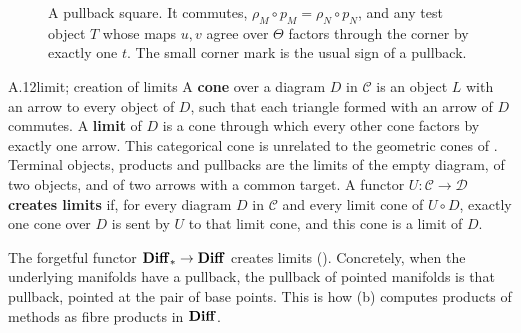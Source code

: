 \begin{figure}[tbp]
\centering
{}
\caption{A pullback square. It commutes, $\rho_M\circ p_M=\rho_N\circ p_N$, and any test object $T$ whose maps $u,v$
  agree over $\Theta$ factors through the corner by exactly one $t$. The small corner mark is the usual sign of a
  pullback.}
\label{fig:bg-pullback}
\end{figure}


\begin{bgentry}{A.12}{limit; creation of limits}
A \textbf{cone} over a diagram $D$ in $\mathcal C$ is an object $L$ with an arrow to every object of $D$, such that each
triangle formed with an arrow of $D$ commutes. A \textbf{limit} of $D$ is a cone through which every other cone factors
by exactly one arrow. This categorical cone is unrelated to the geometric cones of . Terminal objects,
products and pullbacks are the limits of the empty diagram, of two objects, and of two arrows with a common target. A
functor $U:\mathcal C\to\mathcal D$ \textbf{creates limits} if, for every diagram $D$ in $\mathcal C$ and every limit cone
of $U\circ D$, exactly one cone over $D$ is sent by $U$ to that limit cone, and this cone is a limit of $D$.
\end{bgentry}

The forgetful functor $\mathbf{Diff}_*\to\mathbf{Diff}$ creates limits (). Concretely, when the underlying manifolds have a
pullback, the pullback of pointed manifolds is that pullback, pointed at the pair of base points. This is how
(b) computes products of methods as fibre products in $\mathbf{Diff}$.



